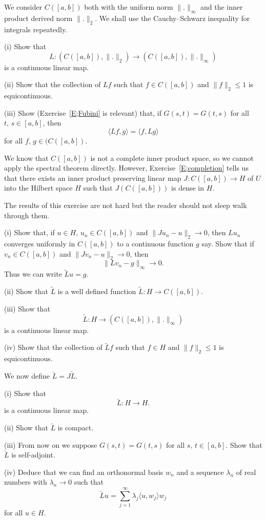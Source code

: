 \begin{exercise}\label{D4} 
We consider $C([a,b])$ both with the
uniform norm $\|.\|_{\infty}$ and the inner product derived
norm $\|.\|_{2}$. We shall use the Cauchy--Schwarz inequality
for integrals repeatedly.
 
(i) Show that
\[L:(C([a,b]),\|.\|_{2})\rightarrow (C([a,b]),\|.\|_{\infty})\]
is a continuous linear map.

(ii) Show that the collection of $Lf$ such that $f\in C([a,b])$
and $\|f\|_{2}\leq 1$ is equicontinuous.

(iii) Show (Exercise~\ref{E;Fubini} is relevant) that,
if $G(s,t)=G(t,s)$ for all $t,\,s\in[a,b]$, then
\[\langle Lf,g\rangle=\langle f,Lg\rangle\]
for all $f,\,g\in (C([a,b])$.
\end{exercise}
We know that $C([a,b])$ is not a complete inner product space, so we cannot
apply the spectral theorem directly. However,
Exercise~\ref{E;completion} tells us that 
there exists an inner product preserving 
linear map
$J:C([a,b])\rightarrow H$ of $U$ into the Hilbert space $H$
such that $J(C([a,b]))$ is dense in $H$.
\begin{exercise}\label{D5} The results of this exercise are not hard
but the reader should not sleep walk through them.

(i) Show that, if $u\in H$, $u_{n}\in C([a,b])$ and 
$\|Ju_{n}-u\|_{2}\rightarrow 0$, then $Lu_{n}$ converges
uniformly in $C([a,b])$ to a continuous function $g$ say.
Show that if $v_{n}\in C([a,b])$ and 
$\|Jv_{n}-u\|_{2}\rightarrow 0$, then
\[\|Lv_{n}-g\|_{\infty}\rightarrow 0.\]
Thus we can write $\tilde{L}u=g$.

(ii) Show that $\tilde{L}$ is a well defined function
$\tilde{L}:H\rightarrow C([a,b])$.

(iii) Show that
\[\tilde{L}:H\rightarrow (C([a,b]),\|.\|_{\infty})\]
is a continuous linear map.

(iv) Show that the collection of $\tilde{L}f$ such that $f\in H$
and $\|f\|_{2}\leq 1$ is equicontinuous.
\end{exercise} 
\begin{exercise}\label{D6} We now define $\breve{L}=J\tilde{L}$.

(i) Show that
\[\breve{L}:H\rightarrow H.\]
is a continuous linear map.

(ii) Show that $\breve{L}$ is compact.

(iii) From now on we suppose $G(s,t)=G(t,s)$ for all $s,\,t\in[a,b]$.
Show that $\breve{L}$ is self-adjoint.

(iv) Deduce that 
we can find an orthonormal basis $w_{n}$ and a sequence $\lambda_{n}$
of real numbers with $\lambda_{n}\rightarrow 0$ such that
\[\breve{L}u=\sum_{j=1}^{\infty}\lambda_{j}\langle u,w_{j}\rangle w_{j}\]
for all $u\in H$.
\end{exercise}
